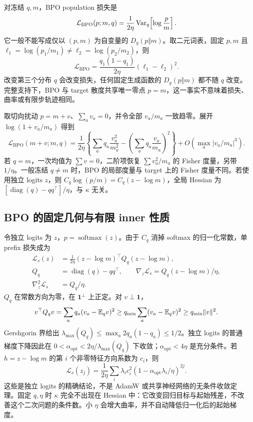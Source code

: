 对冻结 $q,m$，BPO population 损失是
\begin{equation}
 \mathcal L_{\mathrm{BPO}}(p;m,q)
 =\frac1{2\eta}\operatorname{Var}_q\!\left[\log\frac p m\right].
 \label{eq:divergence-map-bpo-loss}
\end{equation}
它一般不能写成仅以 $(p,m)$ 为自变量的 $D_g(p\Vert m)$。取二元词表，固定 $p,m$ 且 $\ell_1=\log(p_1/m_1)\ne\ell_2=\log(p_2/m_2)$，则
\begin{equation}
 \mathcal L_{\mathrm{BPO}}=\frac{q_1(1-q_1)}{2\eta}(\ell_1-\ell_2)^2.
\end{equation}
改变第三个分布 $q$ 会改变损失，任何固定生成函数的 $D_g(p\Vert m)$ 都不随 $q$ 改变。完整支持下，BPO 与 target 散度共享唯一零点 $p=m$，这一事实不意味着损失、曲率或有限步轨迹相同。

取切向扰动 $p=m+v$、$\sum_av_a=0$，并令全部 $v_a/m_a$ 一致趋零。展开 $\log(1+v_a/m_a)$ 得到
\begin{equation}
 \mathcal L_{\mathrm{BPO}}(m+v;m,q)
 =\frac1{2\eta}\left\{\sum_aq_a\frac{v_a^2}{m_a^2}
 -\left(\sum_aq_a\frac{v_a}{m_a}\right)^2\right\}
 +O\!\left(\max_a|v_a/m_a|^3\right).
\end{equation}
若 $q=m$，一次均值为 $\sum v=0$，二阶项恢复 $\sum v_a^2/m_a$ 的 Fisher 度量，另带 $1/\eta$。一般冻结 $q\ne m$ 时，BPO 的局部度量与 target 上的 Fisher 度量不同。若使用独立 logits $z$，则 $C_q\log(p/m)=C_q(z-\log m)$，全局 Hessian 为 $[\operatorname{diag}(q)-qq^\top]/\eta$，与 $\kappa$ 无关。

\subsection{BPO 的固定几何与有限 inner 性质}

令独立 logits 为 $z$，$p=\operatorname{softmax}(z)$。由于 $C_q$ 消掉 softmax 的归一化常数，单 prefix 损失成为
\begin{align}
 \mathcal L_s(z)&=\frac1{2\eta}
    (z-\log m)^\top Q_q(z-\log m),\\
 Q_q&=\operatorname{diag}(q)-qq^\top,\qquad
 \nabla_z\mathcal L_s=Q_q(z-\log m)/\eta,\\
 \nabla_z^2\mathcal L_s&=Q_q/\eta.
\end{align}
$Q_q$ 在常数方向为零，在 $\boldsymbol1^\perp$ 上正定。对 $v\perp\boldsymbol1$，
\begin{equation}
 v^\top Q_qv=\sum_aq_a(v_a-\mathbb E_qv)^2
 \ge q_{\min}\sum_a(v_a-\mathbb E_qv)^2
 \ge q_{\min}\|v\|^2.
\end{equation}
Gershgorin 界给出 $\lambda_{\max}(Q_q)\le\max_a2q_a(1-q_a)\le1/2$。独立 logits 的普通梯度下降因此在 $0<\alpha_{\mathrm{opt}}<2\eta/\lambda_{\max}(Q_q)$ 下收敛；$\alpha_{\mathrm{opt}}<4\eta$ 是充分条件。若 $h=z-\log m$ 的第 $i$ 个非零特征方向系数为 $c_i$，则
\begin{equation}
 \mathcal L_s(z_j)=\frac1{2\eta}\sum_i\lambda_i c_i^2
    (1-\alpha_{\mathrm{opt}}\lambda_i/\eta)^{2j}.
\end{equation}
这些是独立 logits 的精确结论，不是 AdamW 或共享神经网络的无条件收敛定理。固定 $q,\eta$ 时 $\kappa$ 完全不出现在 Hessian 中：它改变回归目标与起始残差，不改善这个二次问题的条件数。小 $\eta$ 会增大曲率，并不自动降低归一化后的起始梯度。

